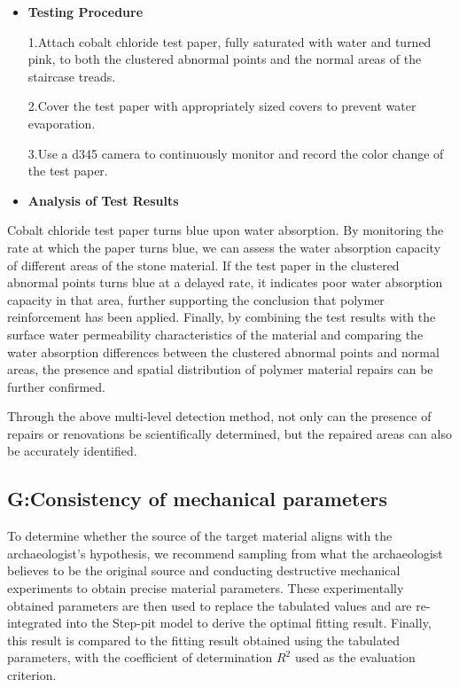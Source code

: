 \documentclass{mcmthesis}
\begin{document}
\begin{itemize}[label=$\diamond$]
\item \textbf{Testing Procedure}

1.Attach cobalt chloride test paper, fully saturated with water and turned pink, to both the clustered abnormal points and the normal areas of the staircase treads.

2.Cover the test paper with appropriately sized covers to prevent water evaporation.

3.Use a d345 camera to continuously monitor and record the color change of the test paper.


\item \textbf{Analysis of Test Results}

\end{itemize}
Cobalt chloride test paper turns blue upon water absorption. By monitoring the rate at which the paper turns blue, we can assess the water absorption capacity of different areas of the stone material.
If the test paper in the clustered abnormal points turns blue at a delayed rate, it indicates poor water absorption capacity in that area, further supporting the conclusion that polymer reinforcement has been applied.
Finally, by combining the test results with the surface water permeability characteristics of the material and comparing the water absorption differences 
between the clustered abnormal points and normal areas, the presence and spatial distribution of polymer material repairs can be further confirmed.

Through the above multi-level detection method, not only can the presence of repairs or renovations be scientifically determined, but the repaired areas can also be accurately identified.

\subsection{G:Consistency of mechanical parameters}

To determine whether the source of the target material aligns with the archaeologist's hypothesis, we recommend sampling from what the archaeologist believes to be the original source and conducting destructive mechanical experiments to obtain precise material parameters. These experimentally obtained parameters are then used to replace the tabulated values and are re-integrated into the Step-pit model to derive the optimal fitting result. Finally, this result is compared to the fitting result obtained using the tabulated parameters, with the coefficient of determination $R^2$ used as the evaluation criterion.
\end{document}
